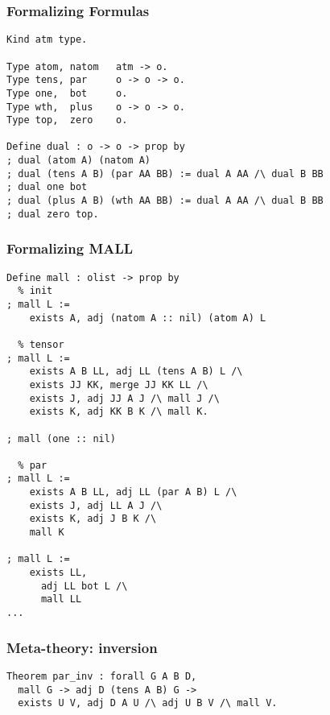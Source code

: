 \documentclass{beamer}
\begin{document}
%
%

\begin{frame}[fragile]
  \frametitle{Formalizing Formulas}

\begin{lstlisting}
Kind atm type.

Type atom, natom   atm -> o.
Type tens, par     o -> o -> o.
Type one,  bot     o.
Type wth,  plus    o -> o -> o.
Type top,  zero    o.

Define dual : o -> o -> prop by
; dual (atom A) (natom A)
; dual (tens A B) (par AA BB) := dual A AA /\ dual B BB
; dual one bot
; dual (plus A B) (wth AA BB) := dual A AA /\ dual B BB
; dual zero top.
\end{lstlisting}
\end{frame}

\begin{frame}[fragile]
  \frametitle{Formalizing MALL}

  \mbox{} \bigskip

\begin{lstlisting}
Define mall : olist -> prop by
  % init
; mall L :=
    exists A, adj (natom A :: nil) (atom A) L

  % tensor
; mall L :=
    exists A B LL, adj LL (tens A B) L /\
    exists JJ KK, merge JJ KK LL /\
    exists J, adj JJ A J /\ mall J /\
    exists K, adj KK B K /\ mall K.

; mall (one :: nil)

  % par
; mall L :=
    exists A B LL, adj LL (par A B) L /\
    exists J, adj LL A J /\
    exists K, adj J B K /\
    mall K

; mall L :=
    exists LL,
      adj LL bot L /\
      mall LL
...
\end{lstlisting}
\end{frame}

\begin{frame}[fragile]
  \frametitle{Meta-theory: inversion}


\begin{lstlisting}
Theorem par_inv : forall G A B D,
  mall G -> adj D (tens A B) G ->
  exists U V, adj D A U /\ adj U B V /\ mall V.
\end{lstlisting}
\end{frame}
\end{document}
